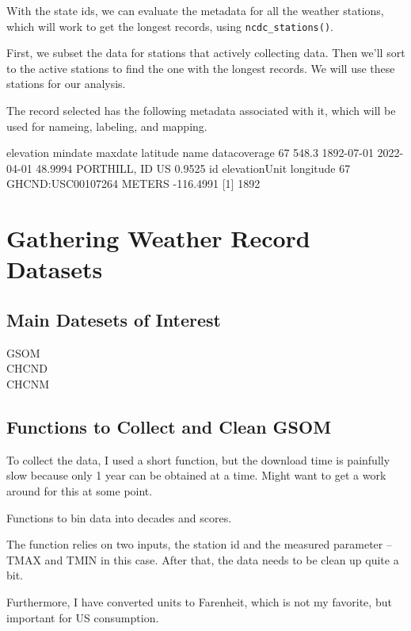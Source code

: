 \documentclass{article}\usepackage[]{graphicx}\usepackage[]{color}
\begin{document}
With the state ids, we can evaluate the metadata for all the weather stations, which will work to get the longest records, using \texttt{ncdc\_stations()}. 

First, we subset the data for stations that actively collecting data. Then we'll sort to the active stations to find the one with the longest records. We will use these stations for our analysis.



The record selected has the following metadata associated with it, which will be used for nameing, labeling, and mapping. 

   elevation    mindate    maxdate latitude            name datacoverage
67     548.3 1892-07-01 2022-04-01  48.9994 PORTHILL, ID US       0.9525
                  id elevationUnit longitude
67 GHCND:USC00107264        METERS -116.4991
[1] 1892


\section{Gathering Weather Record Datasets}

\subsection{Main Datesets of Interest}

\begin{description}
  \item[GSOM]
  \item[CHCND]
  \item[CHCNM]
\end{description}

\subsection{Functions to Collect and Clean GSOM}

To collect the data, I used a short function, but the download time is painfully slow because only 1 year can be obtained at a time. Might want to get a work around for this at some point. 



Functions to bin data into decades and scores. 



The function relies on two inputs, the station id and the measured parameter -- TMAX and TMIN in this case. After that, the data needs to be clean up quite a bit. 

Furthermore, I have converted units to Farenheit, which is not my favorite, but important for US consumption.
\end{document}
